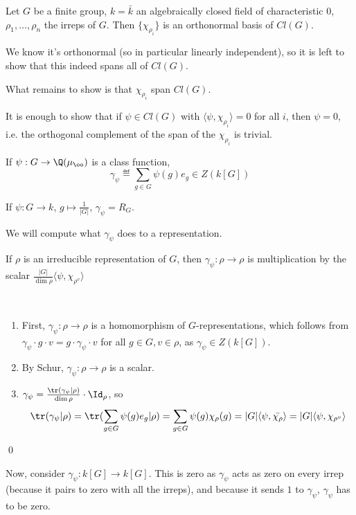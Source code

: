 \documentclass[x11names,reqno,14pt]{extarticle}
\begin{document}
Let $G$ be a finite group, $k = \bar{k}$ an algebraically closed field of characteristic 0, $\rho_1,\dots,\rho_n$ the irreps of $G$. Then $\{\chi_{\rho_i}\}$ is an orthonormal basis of $Cl(G)$.

\proof

We know it's orthonormal (so in particular linearly independent), so it is left to show that this indeed spans all of $Cl(G)$. 

What remains to show is that $\chi_{\rho_i}$ span $Cl(G)$.

It is enough to show that if $\psi\in Cl(G)$ with $\langle\psi,\chi_{\rho_i}\rangle = 0$ for all $i$, then $\psi = 0$, i.e. the orthogonal complement of the span of the $\chi_{\rho_i}$ is trivial. 


If $\psi:G\to\Q(\mu_\oo)$ is a class function, 
\[
\gamma_\psi\eqdef\sum_{g\in G}\psi(g)e_g \in Z(k[G])
\]

\exm

If $\psi:G\to k$, $g \mapsto \frac{1}{|G|}$, $\gamma_\psi = R_G$. 

We will compute what $\gamma_\psi$ does to a representation. 

\prop 

If $\rho$ is an irreducible representation of $G$, then $\gamma_\psi:\rho\to\rho$ is multiplication by the scalar $\frac{|G|}{\dim\rho}\langle\psi,\chi_{\rho^v}\rangle$

\proof
\,

\begin{enumerate}

\item First, $\gamma_\psi:\rho\to\rho$ is a homomorphism of $G$-representations, which follows from $\gamma_\psi\cdot g \cdot v = g\cdot \gamma_\psi\cdot v$ for all $g \in G, v \in \rho$, as $\gamma_\psi\in Z(k[G])$.

\item By Schur, $\gamma_\psi:\rho\to\rho$ is a scalar. 

\item $\gamma_\psi = \frac{\tr(\gamma_\psi|\rho)}{\dim\rho}\cdot\Id_\rho$, so
\[
\tr(\gamma_\psi|\rho) = \tr(\sum_{g\in G}\psi(g)e_g|\rho) = \sum_{g\in G}\psi(g)\chi_\rho(g) = |G|\langle\psi,\bar{\chi_\rho}\rangle = |G| \langle\psi, \chi_{\rho^v}\rangle
\]

\end{enumerate}

\qed

Now, consider $\gamma_\psi:k[G]\to k[G]$. This is zero as $\gamma_\psi$ acts as zero on every irrep (because it pairs to zero with all the irreps), and because it sends $1$ to $\gamma_\psi$, $\gamma_\psi$ has to be zero. 
\end{document}
